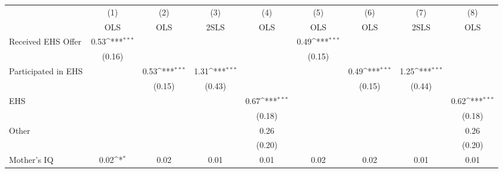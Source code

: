 {
\def\sym#1{\ifmmode^{#1}\else\(^{#1}\)\fi}
\begin{tabular}{l*{8}{c}}
\hline\hline
                    &\multicolumn{1}{c}{(1)}&\multicolumn{1}{c}{(2)}&\multicolumn{1}{c}{(3)}&\multicolumn{1}{c}{(4)}&\multicolumn{1}{c}{(5)}&\multicolumn{1}{c}{(6)}&\multicolumn{1}{c}{(7)}&\multicolumn{1}{c}{(8)}\\
                    &\multicolumn{1}{c}{OLS}&\multicolumn{1}{c}{OLS}&\multicolumn{1}{c}{2SLS}&\multicolumn{1}{c}{OLS}&\multicolumn{1}{c}{OLS}&\multicolumn{1}{c}{OLS}&\multicolumn{1}{c}{2SLS}&\multicolumn{1}{c}{OLS}\\
\hline
Received EHS Offer  &        0.53\sym{***}&                     &                     &                     &        0.49\sym{***}&                     &                     &                     \\
                    &      (0.16)         &                     &                     &                     &      (0.15)         &                     &                     &                     \\
[1em]
Participated in EHS &                     &        0.53\sym{***}&        1.31\sym{***}&                     &                     &        0.49\sym{***}&        1.25\sym{***}&                     \\
                    &                     &      (0.15)         &      (0.43)         &                     &                     &      (0.15)         &      (0.44)         &                     \\
[1em]
EHS                 &                     &                     &                     &        0.67\sym{***}&                     &                     &                     &        0.62\sym{***}\\
                    &                     &                     &                     &      (0.18)         &                     &                     &                     &      (0.18)         \\
[1em]
Other               &                     &                     &                     &        0.26         &                     &                     &                     &        0.26         \\
                    &                     &                     &                     &      (0.20)         &                     &                     &                     &      (0.20)         \\
[1em]
Mother's IQ         &        0.02\sym{*}  &        0.02         &        0.01         &        0.01         &        0.02         &        0.02         &        0.01         &        0.01         \\

\end{tabular}}
